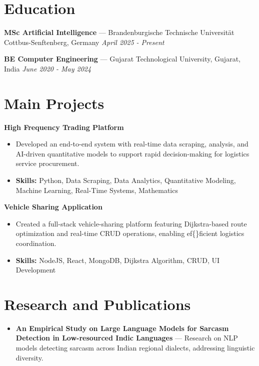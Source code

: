 \documentclass[a4paper,10pt]{article}
\begin{document}
\section*{Education}
\textbf{MSc Artificial Intelligence} — Brandenburgische Technische Universität Cottbus-Senftenberg, Germany \hfill \textit{April 2025 - Present}\par
\vspace{1.5pt}
\textbf{BE Computer Engineering} — Gujarat Technological University, Gujarat, India \hfill \textit{June 2020 - May 2024}\par

\section*{Main Projects}
\textbf{High Frequency Trading Platform}\par
\vspace{1pt}
\begin{itemize}
  \item Developed an end-to-end system with real-time data scraping, analysis, and AI-driven quantitative models to support rapid decision-making for logistics service procurement.
  \item \textbf{Skills:} Python, Data Scraping, Data Analytics, Quantitative Modeling, Machine Learning, Real-Time Systems, Mathematics
\end{itemize}
\vspace{3pt}
\textbf{Vehicle Sharing Application}\par
\vspace{1pt}
\begin{itemize}
  \item Created a full-stack vehicle-sharing platform featuring Dijkstra-based route optimization and real-time CRUD operations, enabling ef\{\}ficient logistics coordination.
  \item \textbf{Skills:} NodeJS, React, MongoDB, Dijkstra Algorithm, CRUD, UI Development
\end{itemize}

\section*{Research and Publications}
\begin{itemize}
\item \textbf{An Empirical Study on Large Language Models for Sarcasm Detection in Low-resourced Indic Languages} — Research on NLP models detecting sarcasm across Indian regional dialects, addressing linguistic diversity.
\end{itemize}
\end{document}
